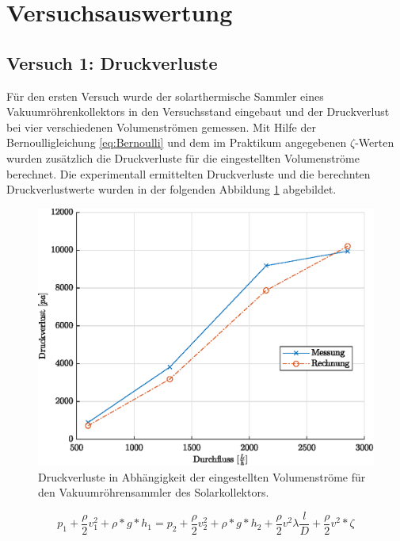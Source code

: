 \section{Versuchsauswertung}

\subsection{Versuch 1: Druckverluste}

Für den ersten Versuch wurde der solarthermische Sammler eines Vakuumröhrenkollektors in den Versuchsstand eingebaut und der Druckverlust bei vier verschiedenen Volumenströmen gemessen. 
Mit Hilfe der Bernoulligleichung \ref{eq:Bernoulli} und dem im Praktikum angegebenen $\zeta$-Werten wurden zusätzlich die Druckverluste für die eingestellten Volumenströme berechnet. Die experimentall ermittelten Druckverluste und die berechnten Druckverlustwerte wurden in der folgenden Abbildung \ref{fig:drucksammler} abgebildet. 

	\begin{figure}[H]
	\centering
	\includegraphics[height=0.3\textheight]{../DATA/dPPlot.eps}
	\caption[Druckverluste in Abhängigkeit der eingestellten Volumenströme für den Vakuumröhrensammler des Solarkollektors]{Druckverluste in Abhängigkeit der eingestellten Volumenströme für den Vakuumröhrensammler des Solarkollektors.}
	\label{fig:drucksammler}
	\end{figure}

\begin{equation}
	\label{eq:Bernoulli}
	p_1 + \frac{\rho}{2}v_1^2 + \rho*g*h_1 = p_2 + \frac{\rho}{2}v_2^2+\rho*g*h_2 + \frac{\rho}{2}v^2\lambda\frac{l}{D}+\frac{\rho}{2}v^2*\zeta
\end{equation}

